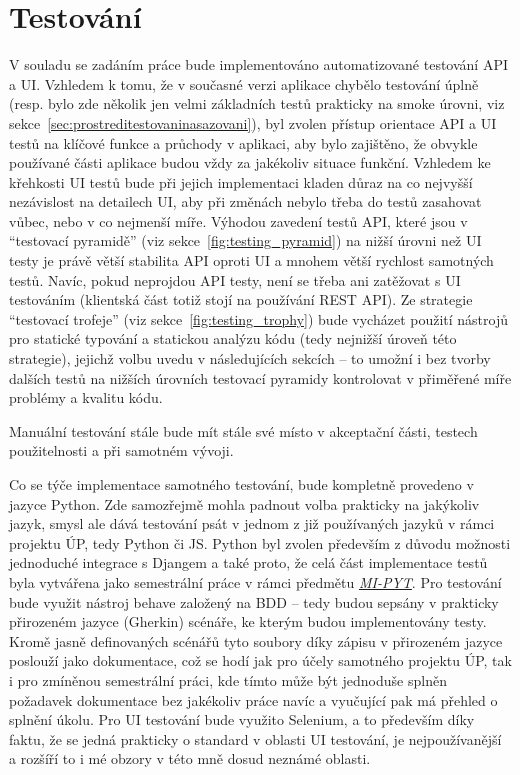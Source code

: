 \section{Testování}\label{sec:zvolenetechnologie-testovani}

V souladu se zadáním práce bude implementováno automatizované testování API a UI. Vzhledem k tomu, že v současné verzi aplikace chybělo testování úplně (resp. bylo zde několik jen velmi základních testů prakticky na smoke úrovni, viz sekce~\ref{sec:prostreditestovaninasazovani}), byl zvolen přístup orientace API a UI testů na klíčové funkce a průchody v aplikaci, aby bylo zajištěno, že obvykle používané části aplikace budou vždy za jakékoliv situace funkční. Vzhledem ke křehkosti UI testů bude při jejich implementaci kladen důraz na co nejvyšší nezávislost na detailech UI, aby při změnách nebylo třeba do testů zasahovat vůbec, nebo v co nejmenší míře. Výhodou zavedení testů API, které jsou v \enquote{testovací pyramidě} (viz sekce~\ref{fig:testing_pyramid}) na nižší úrovni než UI testy je právě větší stabilita API oproti UI a mnohem větší rychlost samotných testů. Navíc, pokud neprojdou API testy, není se třeba ani zatěžovat s UI testováním (klientská část totiž stojí na používání REST API). Ze strategie \enquote{testovací trofeje} (viz sekce~\ref{fig:testing_trophy}) bude vycházet použití nástrojů pro statické typování a statickou analýzu kódu (tedy nejnižší úroveň této strategie), jejichž volbu uvedu v následujících sekcích -- to umožní i bez tvorby dalších testů na nižších úrovních testovací pyramidy kontrolovat v přiměřené míře problémy a kvalitu kódu.

Manuální testování stále bude mít stále své místo v akceptační části, testech použitelnosti a při samotném vývoji.

Co se týče implementace samotného testování, bude kompletně provedeno v jazyce Python. Zde samozřejmě mohla padnout volba prakticky na jakýkoliv jazyk, smysl ale dává testování psát v jednom z již používaných jazyků v rámci projektu ÚP, tedy Python či JS. Python byl zvolen především z důvodu možnosti jednoduché integrace s Djangem a také proto, že celá část implementace testů byla vytvářena jako semestrální práce v rámci předmětu \textit{\href{https://courses.fit.cvut.cz/MI-PYT/}{MI-PYT}}. Pro testování bude využit nástroj behave založený na BDD -- tedy budou sepsány v prakticky přirozeném jazyce (Gherkin) scénáře, ke kterým budou implementovány testy. Kromě jasně definovaných scénářů tyto soubory díky zápisu v přirozeném jazyce poslouží jako dokumentace, což se hodí jak pro účely samotného projektu ÚP, tak i pro zmíněnou semestrální práci, kde tímto může být jednoduše splněn požadavek dokumentace bez jakékoliv práce navíc a vyučující pak má přehled o splnění úkolu. Pro UI testování bude využito Selenium, a to především díky faktu, že se jedná prakticky o standard v oblasti UI testování, je nejpoužívanější a rozšíří to i mé obzory v této mně dosud neznámé oblasti.

